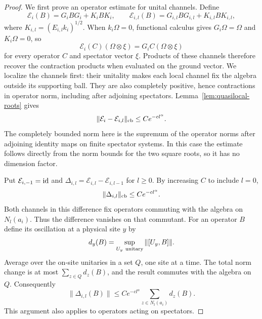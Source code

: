 \begin{proof}
We first prove an operator estimate for unital channels.  Define
\[
 \mathcal E_i(B)=G_iBG_i+K_iBK_i,
 \qquad
 \mathcal E_{i,l}(B)=G_{i,l}BG_{i,l}+K_{i,l}BK_{i,l},
\]
where $K_{i,l}=(E_{i,l}k_i)^{1/2}$.  When $k_i\Omega=0$, functional
calculus gives $G_i\Omega=\Omega$ and $K_i\Omega=0$, so
\begin{equation}\label{eq:amplification-channel-vector}
 \mathcal E_i(C)(\Omega\otimes\xi)=G_iC(\Omega\otimes\xi)
\end{equation}
for every operator $C$ and spectator vector $\xi$.  Products of these
channels therefore recover the contraction products when evaluated on
the ground vector.  We localize the channels first: their unitality
makes each local channel fix the algebra outside its supporting ball.
They are also completely positive, hence contractions in operator norm,
including after adjoining spectators.  Lemma~\ref{lem:quasilocal-roots} gives
\begin{equation}\label{eq:amplification-channel-approximation}
 \|\mathcal E_i-\mathcal E_{i,l}\|_{\rm cb}
 \le C e^{-c l^\alpha}.
\end{equation}
The completely bounded norm here is the supremum of the operator norms
after adjoining identity maps on finite spectator systems.  In this
case the estimate follows directly from the norm bounds for the two
square roots, so it has no dimension factor.

Put $\mathcal E_{i,-1}=\operatorname{id}$ and
$\Delta_{i,l}=\mathcal E_{i,l}-\mathcal E_{i,l-1}$ for $l\ge0$.
By increasing $C$ to include $l=0$,
\begin{equation}\label{eq:amplification-channel-shells}
 \|\Delta_{i,l}\|_{\rm cb}\le C e^{-c l^\alpha}.
\end{equation}
Both channels in this difference fix operators commuting with the
algebra on $N_l(a_i)$.  Thus the difference vanishes on that
commutant.  For an operator $B$ define its oscillation at a physical
site $y$ by
\[
 d_y(B)=\sup_{U_y\ {\rm unitary}}\|[U_y,B]\|.
\]
Average over the on-site unitaries in a set $Q$, one site at a time.
The total norm change is at most $\sum_{z\in Q}d_z(B)$, and the result
commutes with the algebra on $Q$.  Consequently
\begin{equation}\label{eq:amplification-shell-oscillation}
 \|\Delta_{i,l}(B)\|
 \le C e^{-c l^\alpha}\sum_{z\in N_l(a_i)}d_z(B).
\end{equation}
This argument also applies to operators acting on spectators.


\end{proof}
